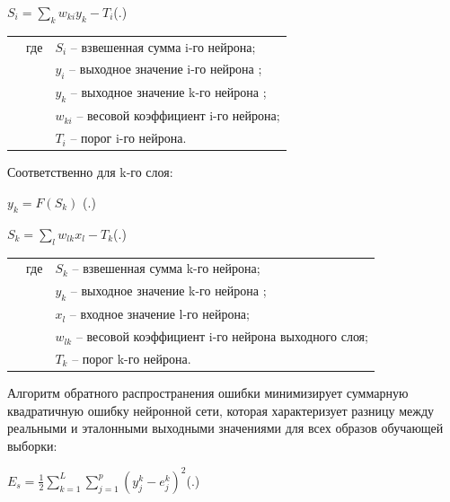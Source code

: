{	\formulaspace \par \redline 
	$S_{i} = \sum \limits _{k}^{} w_{ki}y_{k} - T_{i}$\hfill (\thechaptercntr .\theformulacntr) \redline
	\formulaspace \addtocounter{formulacntr}{1}
	
	\begin{tabular}{p{}p{}p{}}
		& где  & $S_{i}$ {--} взвешенная сумма i-го нейрона; \\
		&      & $y_{i}$ {--} выходное значение i-го нейрона ; \\
		&      & $y_{k}$ {--} выходное значение k-го нейрона ; \\
		&      & $w_{ki}$ {--} весовой коэффициент i-го нейрона; \\
		&      & $T_{i}$ {--} порог i-го нейрона. \\
	\end{tabular}
	
    \par \redline 	Соответственно для k-го слоя:
	
	\formulaspace \par \redline 
	$y_{k} = F(S_{k}) $
	\hfill (\thechaptercntr .\theformulacntr) \redline
	\formulaspace \addtocounter{formulacntr}{1}
	
	\formulaspace \par \redline 
	$S_{k} = \sum \limits _{l}^{} w_{lk}x_{l} - T_{k}$\hfill (\thechaptercntr .\theformulacntr) \redline
	\formulaspace \addtocounter{formulacntr}{1}
	
	\begin{tabular}{p{}p{}p{}}
		& где  & $S_{k}$ {--} взвешенная сумма k-го нейрона; \\
		&      & $y_{k}$ {--} выходное значение k-го нейрона ; \\
		&      & $x_{l}$ {--} входное значение l-го нейрона; \\
		&      & $w_{lk}$ {--} весовой коэффициент i-го нейрона выходного слоя; \\
		&      & $T_{k}$ {--} порог k-го нейрона. \\
	\end{tabular}
	
	\par \redline Алгоритм обратного распространения ошибки минимизирует суммарную квадратичную ошибку нейронной сети, которая характеризует разницу между реальными и эталонными выходными значениями для всех образов обучающей выборки:
	
	\formulaspace \par \redline 
	$E_{s} = \frac{1}{2}\sum \limits _{k=1}^{L} \sum \limits _{j=1}^{p} (y_{j}^{k} - e_{j}^{k})^{2} $\hfill (\thechaptercntr .\theformulacntr) \redline
	\formulaspace \addtocounter{formulacntr}{1}
	
}
